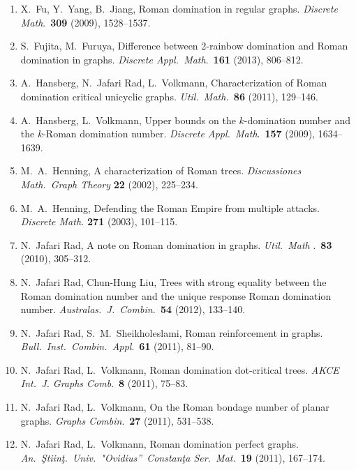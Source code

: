 \documentclass[12pt]{article}%
\begin{document}
\begin{enumerate}
\item X.~Fu, Y.~Yang, B.~Jiang, Roman domination in regular graphs.
\emph{Discrete Math}.~\textbf{309} (2009), 1528--1537.

\item S.~Fujita, M.~Furuya, Difference between 2-rainbow domination and Roman
domination in graphs. \emph{Discrete Appl.~Math}.~\textbf{161} (2013), 806--812.

\item A.~Hansberg, N.~Jafari Rad, L.~Volkmann, Characterization of Roman
domination critical unicyclic graphs. \emph{Util.~Math.~}\textbf{86} (2011), 129--146.

\item A.~Hansberg, L.~Volkmann, Upper bounds on the $k$-domination number and
the $k$-Roman domination number. \emph{Discrete Appl.~Math}.~\textbf{157}
(2009), 1634--1639.

\item M.~A.~Henning, A characterization of Roman trees. \emph{Discussiones
Math.~Graph Theory} \textbf{22} (2002), 225--234.

\item M.~A.~Henning, Defending the Roman Empire from multiple attacks.
\emph{Discrete Math. }\textbf{271} (2003), 101--115.

\item N.~Jafari Rad, A note on Roman domination in graphs. \emph{Util.~Math}%
.~\textbf{83} (2010), 305--312.

\item N.~Jafari Rad, Chun-Hung Liu, Trees with strong equality between the
Roman domination number and the unique response Roman domination number.
\emph{Australas.~J.~Combin.~}\textbf{54} (2012), 133--140.

\item N.~Jafari Rad, S.~M.~Sheikholeslami, Roman reinforcement in graphs.
\emph{Bull.~Inst.~Combin.~Appl}.~\textbf{61} (2011), 81--90.

\item N.~Jafari Rad, L.~Volkmann, Roman domination dot-critical trees.
\emph{AKCE Int.~J. Graphs Comb}.~\textbf{8} (2011), 75--83.

\item N.~Jafari Rad, L.~Volkmann, On the Roman bondage number of planar
graphs. \emph{Graphs Combin}.~\textbf{27} (2011), 531--538.

\item N.~Jafari Rad, L.~Volkmann, Roman domination perfect graphs.
\emph{An.~\c{S}tiin\c{t}.~Univ.~"Ovidius\textquotedblright\ Constan\c{t}a
Ser.~Mat.}~\textbf{19} (2011), 167--174.


\end{enumerate}
\end{document}
